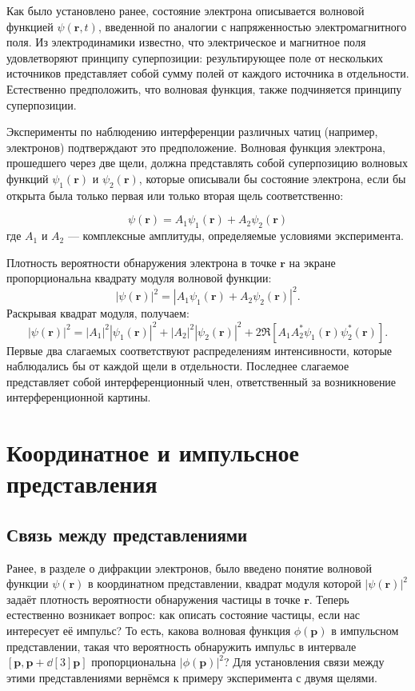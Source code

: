 \documentclass[a4paper, 12pt]{article}
\begin{document}
Как было установлено ранее, состояние электрона описывается волновой функцией
$\psi(\bm{r}, t)$, введенной по аналогии с напряженностью электромагнитного поля. Из
электродинамики известно, что электрическое и магнитное поля удовлетворяют
принципу суперпозиции: результирующее поле от нескольких источников представляет
собой сумму полей от каждого источника в отдельности. Естественно предположить,
что волновая функция, также подчиняется принципу суперпозиции.

Эксперименты по наблюдению интерференции различных чатиц (например, электронов)
подтверждают это предположение.
Волновая функция электрона, прошедшего через две щели, должна представлять собой
суперпозицию волновых функций $\psi_1(\bm{r})$ и $\psi_2(\bm{r})$, которые описывали бы
состояние электрона, если бы открыта была только первая или только вторая щель
соответственно:

\begin{equation}
  \psi(\bm{r}) = A_1\psi_1(\bm{r}) + A_2\psi_2(\bm{r})
\end{equation}
где $A_1$ и $A_2$ — комплексные амплитуды, определяемые условиями эксперимента.

Плотность вероятности обнаружения электрона в точке $\bm{r}$ на экране
пропорциональна квадрату модуля волновой функции:
\begin{equation}
  |\psi(\bm{r})|^2 = |A_1\psi_1(\bm{r}) + A_2\psi_2(\bm{r})|^2.
\end{equation}
Раскрывая квадрат модуля, получаем:
\begin{equation}
  |\psi(\bm{r})|^2 = |A_1|^2|\psi_1(\bm{r})|^2 + |A_2|^2|\psi_2(\bm{r})|^2 + 2\Re[A_1A_2^*\psi_1(\bm{r})\psi_2^*(\bm{r})].
\end{equation}
Первые два слагаемых соответствуют распределениям интенсивности, которые
наблюдались бы от каждой щели в отдельности. Последнее слагаемое представляет
собой интерференционный член, ответственный за возникновение интерференционной
картины.

\section{Координатное и импульсное представления}

\subsection{Связь между представлениями}

Ранее, в разделе о дифракции электронов, было введено понятие волновой функции $\psi(\bm{r})$ в координатном представлении, квадрат модуля которой $|\psi(\bm{r})|^2$ задаёт плотность вероятности обнаружения частицы в точке $\bm{r}$. Теперь естественно возникает вопрос: как описать состояние частицы, если нас интересует её импульс? То есть, какова волновая функция $\phi(\bm{p})$ в импульсном представлении, такая что вероятность обнаружить импульс в интервале $[\bm{p}, \bm{p} + \dd[3]{\bm{p}}]$ пропорциональна $|\phi(\bm{p})|^2$? Для установления связи между этими представлениями вернёмся к примеру эксперимента с двумя щелями.
\end{document}
